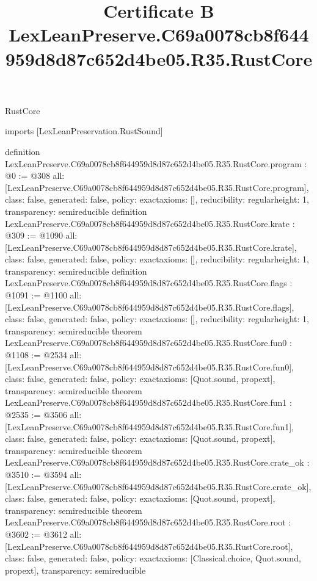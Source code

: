 \begin{lexlean}{RustCore}
\title{Certificate B LexLeanPreserve.C69a0078cb8f644959d8d87c652d4be05.R35.RustCore}
\begin{coremodule}
imports [LexLeanPreservation.RustSound]

definition LexLeanPreserve.C69a0078cb8f644959d8d87c652d4be05.R35.RustCore.program : @0 := @308 {
  all: [LexLeanPreserve.C69a0078cb8f644959d8d87c652d4be05.R35.RustCore.program],
  class: false,
  generated: false,
  policy: exact{axioms: []},
  reducibility: regular{height: 1},
  transparency: semireducible
}
definition LexLeanPreserve.C69a0078cb8f644959d8d87c652d4be05.R35.RustCore.krate : @309 := @1090 {
  all: [LexLeanPreserve.C69a0078cb8f644959d8d87c652d4be05.R35.RustCore.krate],
  class: false,
  generated: false,
  policy: exact{axioms: []},
  reducibility: regular{height: 1},
  transparency: semireducible
}
definition LexLeanPreserve.C69a0078cb8f644959d8d87c652d4be05.R35.RustCore.flags : @1091 := @1100 {
  all: [LexLeanPreserve.C69a0078cb8f644959d8d87c652d4be05.R35.RustCore.flags],
  class: false,
  generated: false,
  policy: exact{axioms: []},
  reducibility: regular{height: 1},
  transparency: semireducible
}
theorem LexLeanPreserve.C69a0078cb8f644959d8d87c652d4be05.R35.RustCore.fun0 : @1108 := @2534 {
  all: [LexLeanPreserve.C69a0078cb8f644959d8d87c652d4be05.R35.RustCore.fun0],
  class: false,
  generated: false,
  policy: exact{axioms: [Quot.sound, propext]},
  transparency: semireducible
}
theorem LexLeanPreserve.C69a0078cb8f644959d8d87c652d4be05.R35.RustCore.fun1 : @2535 := @3506 {
  all: [LexLeanPreserve.C69a0078cb8f644959d8d87c652d4be05.R35.RustCore.fun1],
  class: false,
  generated: false,
  policy: exact{axioms: [Quot.sound, propext]},
  transparency: semireducible
}
theorem LexLeanPreserve.C69a0078cb8f644959d8d87c652d4be05.R35.RustCore.crate_ok : @3510 := @3594 {
  all: [LexLeanPreserve.C69a0078cb8f644959d8d87c652d4be05.R35.RustCore.crate_ok],
  class: false,
  generated: false,
  policy: exact{axioms: [Quot.sound, propext]},
  transparency: semireducible
}
theorem LexLeanPreserve.C69a0078cb8f644959d8d87c652d4be05.R35.RustCore.root : @3602 := @3612 {
  all: [LexLeanPreserve.C69a0078cb8f644959d8d87c652d4be05.R35.RustCore.root],
  class: false,
  generated: false,
  policy: exact{axioms: [Classical.choice, Quot.sound, propext]},
  transparency: semireducible
}


\end{coremodule}
\end{lexlean}
